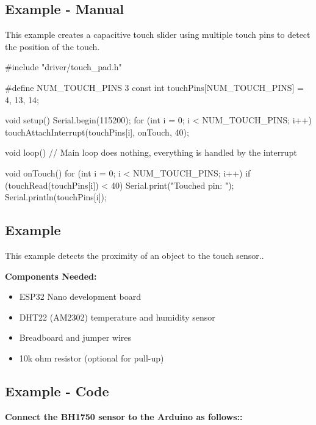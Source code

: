 \subsection{Example - Manual}

This example creates a capacitive touch slider using multiple touch pins to detect the position of the touch.


\begin{Arduino}
	#include "driver/touch_pad.h"
	
	#define NUM_TOUCH_PINS 3
	const int touchPins[NUM_TOUCH_PINS] = {4, 13, 14};
	
	void setup() {
		Serial.begin(115200);
		for (int i = 0; i < NUM_TOUCH_PINS; i++) {
			touchAttachInterrupt(touchPins[i], onTouch, 40);
		}
	}
	
	void loop() {
		// Main loop does nothing, everything is handled by the interrupt
	}
	
	void onTouch() {
		for (int i = 0; i < NUM_TOUCH_PINS; i++) {
			if (touchRead(touchPins[i]) < 40) {
				Serial.print("Touched pin: ");
				Serial.println(touchPins[i]);
			}
		}
	}
	
	
	
\end{Arduino}





\subsection{Example}

This example detects the proximity of an object to the touch sensor..


\textbf{Components Needed:}
\begin{itemize}
	\item ESP32 Nano development board
	\item DHT22 (AM2302) temperature and humidity sensor
	\item Breadboard and jumper wires
	\item 10k ohm resistor (optional for pull-up)
\end{itemize}




\subsection{Example - Code}

\textbf{Connect the BH1750 sensor to the Arduino as follows::} 

